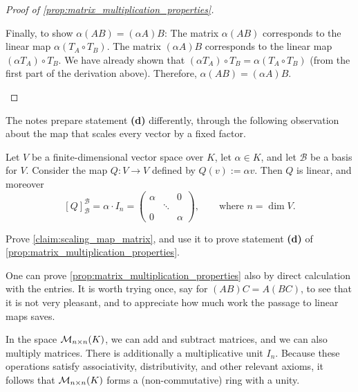 \begin{proof}[Proof of \cref{prop:matrix_multiplication_properties}]
\begin{enumerate}[label=\textbf{(\alph*)}]
    Finally, to show $\alpha(AB) = (\alpha A)B$:
    The matrix $\alpha(AB)$ corresponds to the linear map $\alpha(T_A \circ T_B)$.
    The matrix $(\alpha A)B$ corresponds to the linear map $(\alpha T_A) \circ T_B$.
    We have already shown that $(\alpha T_A) \circ T_B = \alpha (T_A \circ T_B)$ (from the first part of the derivation above).
    Therefore, $\alpha(AB) = (\alpha A)B$.
\end{enumerate}
\end{proof}

The notes prepare statement \textbf{(d)} differently, through the following observation about the map that scales every vector by a fixed factor.

\begin{claim}
\label{claim:scaling_map_matrix}
Let $V$ be a finite-di\-men\-sional vector space over $K$, let $\alpha \in K$, and let $\mathcal{B}$ be a basis for $V$. Consider the map $Q: V \to V$ defined by $Q(v) := \alpha v$. Then $Q$ is linear, and moreover
\[
[Q]_{\mathcal{B}}^{\mathcal{B}} = \alpha \cdot I_n = \begin{pmatrix} \alpha & & 0 \\ & \ddots & \\ 0 & & \alpha \end{pmatrix}, \qquad \text{where } n = \dim V.
\]
\end{claim}

\begin{exercise}
\label{exc:scaling_map_and_statement_d}
Prove \cref{claim:scaling_map_matrix}, and use it to prove statement \textbf{(d)} of \cref{prop:matrix_multiplication_properties}.
\end{exercise}

\begin{remark}
One can prove \cref{prop:matrix_multiplication_properties} also by direct calculation with the entries. It is worth trying once, say for $(AB)C = A(BC)$, to see that it is not very pleasant, and to appreciate how much work the passage to linear maps saves.
\end{remark}


\begin{remark}
\label{rem:matrix_ring}
In the space $\mathcal{M}_{n \times n}(K)$, we can add and subtract matrices, and we can also multiply matrices. There is additionally a multiplicative unit $I_n$. Because these operations satisfy associativity, distributivity, and other relevant axioms, it follows that $\mathcal{M}_{n \times n}(K)$ forms a (non-com\-mu\-ta\-tive) ring with a unity.
\end{remark}

